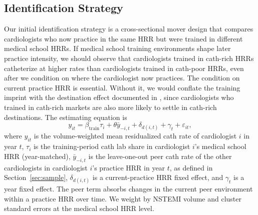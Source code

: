 \documentclass[12pt]{article}
\let\textcite\citet
\begin{document}
\subsection{Identification Strategy}\label{sec:imprint-id}

Our initial identification strategy is a cross-sectional mover design that compares cardiologists who now practice in the same HRR but were trained in different medical school HRRs. If medical school training environments shape later practice intensity, we should observe that cardiologists trained in cath-rich HRRs catheterize at higher rates than cardiologists trained in cath-poor HRRs, even after we condition on where the cardiologist now practices. The condition on current practice HRR is essential. Without it, we would conflate the training imprint with the destination effect documented in \textcite{molitor2018}, since cardiologists who trained in cath-rich markets are also more likely to settle in cath-rich destinations. The estimating equation is
\begin{equation}\label{eq:cs}
y_{it} = \beta_{\text{train}} \tau_{i} + \theta \bar{y}_{-i,t} + \delta_{d(i,t)} + \gamma_{t} + \varepsilon_{it},
\end{equation}
where $y_{it}$ is the volume-weighted mean residualized cath rate of cardiologist $i$ in year $t$, $\tau_{i}$ is the training-period cath lab share in cardiologist $i$'s medical school HRR (year-matched), $\bar{y}_{-i,t}$ is the leave-one-out peer cath rate of the other cardiologists in cardiologist $i$'s practice HRR in year $t$, as defined in Section~\ref{sec:sample}, $\delta_{d(i,t)}$ is a current-practice HRR fixed effect, and $\gamma_t$ is a year fixed effect. The peer term absorbs changes in the current peer environment within a practice HRR over time. We weight by NSTEMI volume and cluster standard errors at the medical school HRR level.
\end{document}
